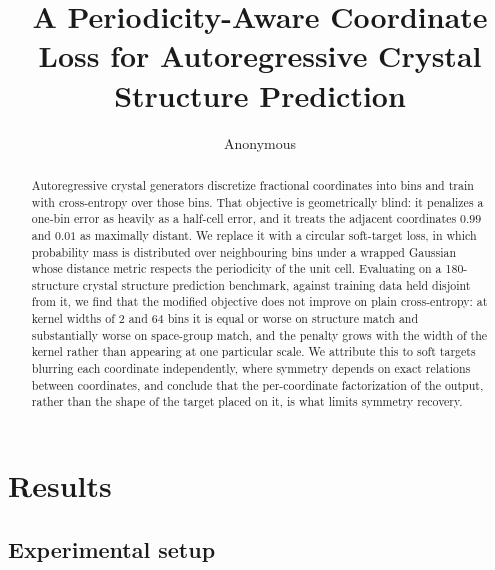 \documentclass[manuscript,screen,review]{acmart}
\begin{document}
\title{A Periodicity-Aware Coordinate Loss for Autoregressive Crystal
Structure Prediction}

\author{Anonymous}

\renewcommand{\shortauthors}{Working draft}

\begin{abstract}
  Autoregressive crystal generators discretize fractional coordinates into
  bins and train with cross-entropy over those bins. That objective is
  geometrically blind: it penalizes a one-bin error as heavily as a half-cell
  error, and it treats the adjacent coordinates $0.99$ and $0.01$ as maximally
  distant. We replace it with a circular soft-target loss, in which probability
  mass is distributed over neighbouring bins under a wrapped Gaussian whose
  distance metric respects the periodicity of the unit cell. Evaluating on a
  180-structure crystal structure prediction benchmark, against training data
  held disjoint from it, we find that the modified objective does not improve on
  plain cross-entropy: at kernel widths of 2 and 64 bins it is equal or worse on
  structure match and substantially worse on space-group match, and the penalty
  grows with the width of the kernel rather than appearing at one particular
  scale. We attribute this to soft targets blurring each coordinate
  independently, where symmetry depends on exact relations between coordinates,
  and conclude that the per-coordinate factorization of the output, rather than
  the shape of the target placed on it, is what limits symmetry recovery.
\end{abstract}


\maketitle

\section{Results}
\label{sec:results}

\subsection{Experimental setup}
\label{sec:setup}
\end{document}
